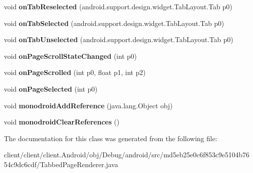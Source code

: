 \begin{DoxyCompactItemize}
\item 
\hypertarget{classmd5eb25e0c6f853c9e5104b7654c9dc6cdf_1_1TabbedPageRenderer_a79c2ac602f2116d856cbc4254b1ad4db}{}void {\bfseries on\+Tab\+Reselected} (android.\+support.\+design.\+widget.\+Tab\+Layout.\+Tab p0)\label{classmd5eb25e0c6f853c9e5104b7654c9dc6cdf_1_1TabbedPageRenderer_a79c2ac602f2116d856cbc4254b1ad4db}

\item 
\hypertarget{classmd5eb25e0c6f853c9e5104b7654c9dc6cdf_1_1TabbedPageRenderer_a9304940fcf0d42bfc4bcbfe6ff023f88}{}void {\bfseries on\+Tab\+Selected} (android.\+support.\+design.\+widget.\+Tab\+Layout.\+Tab p0)\label{classmd5eb25e0c6f853c9e5104b7654c9dc6cdf_1_1TabbedPageRenderer_a9304940fcf0d42bfc4bcbfe6ff023f88}

\item 
\hypertarget{classmd5eb25e0c6f853c9e5104b7654c9dc6cdf_1_1TabbedPageRenderer_ae44a92c20f086e298e043f77f8262999}{}void {\bfseries on\+Tab\+Unselected} (android.\+support.\+design.\+widget.\+Tab\+Layout.\+Tab p0)\label{classmd5eb25e0c6f853c9e5104b7654c9dc6cdf_1_1TabbedPageRenderer_ae44a92c20f086e298e043f77f8262999}

\item 
\hypertarget{classmd5eb25e0c6f853c9e5104b7654c9dc6cdf_1_1TabbedPageRenderer_aee3d4ed0265812b0d648af5d79fd78da}{}void {\bfseries on\+Page\+Scroll\+State\+Changed} (int p0)\label{classmd5eb25e0c6f853c9e5104b7654c9dc6cdf_1_1TabbedPageRenderer_aee3d4ed0265812b0d648af5d79fd78da}

\item 
\hypertarget{classmd5eb25e0c6f853c9e5104b7654c9dc6cdf_1_1TabbedPageRenderer_abfbd91f45daf16f2a83071c0f83a69ad}{}void {\bfseries on\+Page\+Scrolled} (int p0, float p1, int p2)\label{classmd5eb25e0c6f853c9e5104b7654c9dc6cdf_1_1TabbedPageRenderer_abfbd91f45daf16f2a83071c0f83a69ad}

\item 
\hypertarget{classmd5eb25e0c6f853c9e5104b7654c9dc6cdf_1_1TabbedPageRenderer_a700bb083f5cda7ab8d411ea3223fa964}{}void {\bfseries on\+Page\+Selected} (int p0)\label{classmd5eb25e0c6f853c9e5104b7654c9dc6cdf_1_1TabbedPageRenderer_a700bb083f5cda7ab8d411ea3223fa964}

\item 
\hypertarget{classmd5eb25e0c6f853c9e5104b7654c9dc6cdf_1_1TabbedPageRenderer_a1149579655fe16cc9a5e402b3cfa1c44}{}void {\bfseries monodroid\+Add\+Reference} (java.\+lang.\+Object obj)\label{classmd5eb25e0c6f853c9e5104b7654c9dc6cdf_1_1TabbedPageRenderer_a1149579655fe16cc9a5e402b3cfa1c44}

\item 
\hypertarget{classmd5eb25e0c6f853c9e5104b7654c9dc6cdf_1_1TabbedPageRenderer_ae92b7679da1b9dd14b912272aec48588}{}void {\bfseries monodroid\+Clear\+References} ()\label{classmd5eb25e0c6f853c9e5104b7654c9dc6cdf_1_1TabbedPageRenderer_ae92b7679da1b9dd14b912272aec48588}

\end{DoxyCompactItemize}


The documentation for this class was generated from the following file\+:\begin{DoxyCompactItemize}
\item 
client/client/client.\+Android/obj/\+Debug/android/src/md5eb25e0c6f853c9e5104b7654c9dc6cdf/Tabbed\+Page\+Renderer.\+java\end{DoxyCompactItemize}
